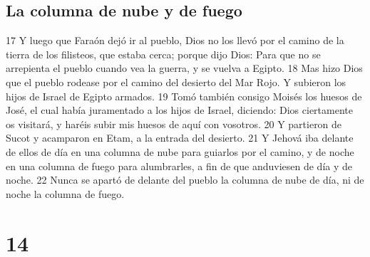 \section{La columna de nube y de fuego}
17 Y luego que Faraón dejó ir al pueblo, Dios no los llevó por el camino de la tierra de los filisteos, que estaba cerca; porque dijo Dios: Para que no se arrepienta el pueblo cuando vea la guerra, y se vuelva a Egipto.
18 Mas hizo Dios que el pueblo rodease por el camino del desierto del Mar Rojo. Y subieron los hijos de Israel de Egipto armados.
19 Tomó también consigo Moisés los huesos de José, el cual había juramentado a los hijos de Israel, diciendo: Dios ciertamente os visitará, y haréis subir mis huesos de aquí con vosotros.
20 Y partieron de Sucot y acamparon en Etam, a la entrada del desierto.
21 Y Jehová iba delante de ellos de día en una columna de nube para guiarlos por el camino, y de noche en una columna de fuego para alumbrarles, a fin de que anduviesen de día y de noche.
22 Nunca se apartó de delante del pueblo la columna de nube de día, ni de noche la columna de fuego.

\chapter{14}

